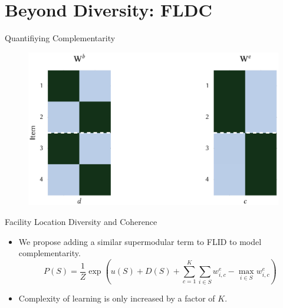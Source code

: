 \documentclass{beamer}
\begin{document}
\section{Beyond Diversity: FLDC}

\begin{frame}{Quantifiying Complementarity}
  \begin{figure}
    \centering
    \includegraphics[height=.8\textheight]{fldc_toy_example_mixed_weights_pres}
  \end{figure}
\end{frame}

\begin{frame}{Facility Location Diversity and Coherence}
  \begin{itemize}
    \item We propose adding a similar supermodular term to FLID to model complementarity.
      \begin{equation*}
        P(S) = \frac{1}{Z}\exp{\left(u(S) + D(S) + \sum_{c=1}^{K}\sum_{i \in S}w^{e}_{i,c} - \max_{i \in S}{w^{e}_{i,c}}\right)}
      \end{equation*}
   \item Complexity of learning is only increased by a factor of $K$.
  \end{itemize}
\end{frame}
\end{document}

